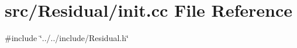 \section{src/\+Residual/init.cc File Reference}
\label{init_8cc}
{\ttfamily \#include \char`\"{}../../include/\+Residual.\+h\char`\"{}}\newline
